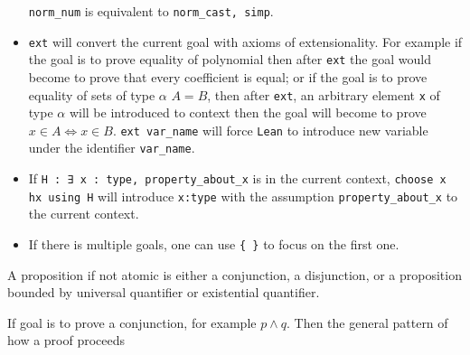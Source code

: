 \documentclass{report}
\theoremstyle{definition}
\theoremstyle{plain}
\begin{document}
\begin{itemize}
\texttt{norm_num} is equivalent to \texttt{norm_cast, simp}.
\item \texttt{ext} will convert the current goal with axioms of extensionality. For example if the goal is to prove equality of polynomial then after {\tt ext} the goal would become to prove that every coefficient is equal; or if the goal is to prove equality of sets of type $\alpha$ $A=B$, then after {\tt ext}, an arbitrary element {\tt x} of type $\alpha$ will be introduced to context then the goal will become to prove $x\in A\iff x\in B$. {\tt ext var\_name} will force {\tt Lean} to introduce new variable under the identifier {\tt var\_name}.
\item If \texttt{H : ∃ x : type, property_about_x} is in the current context, \texttt{choose x hx using H} will introduce {\tt x:type} with the assumption {\tt property\_about\_x} to the current context. 
\item If there is multiple goals, one can use {\tt \{ \}} to focus on the first one.
\end{itemize}

A proposition if not atomic is either a conjunction, a disjunction, or a proposition bounded by universal quantifier or existential quantifier.

If goal is to prove a conjunction, for example $p \land q$. Then the general pattern of how a proof proceeds
\end{document}
